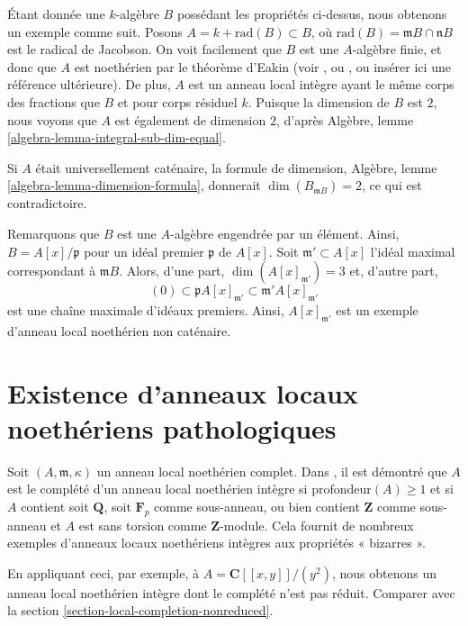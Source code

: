 \medskip\noindent
Étant donnée une $k$-algèbre $B$ possédant les propriétés ci-dessus, nous
obtenons un exemple comme suit. Posons $A = k + \text{rad}(B) \subset B$,
où $\text{rad}(B) = \mathfrak mB \cap \mathfrak nB$ est le radical de Jacobson.
On voit facilement que $B$ est une $A$-algèbre finie, et donc que $A$ est
noethérien par le théorème d'Eakin (voir \cite{Eakin}, ou
\cite[Appendix A1]{Nagata}, ou insérer ici une référence ultérieure).
De plus, $A$ est un anneau local intègre ayant le même corps des fractions que $B$ et
pour corps résiduel $k$. Puisque la dimension de $B$ est $2$, nous voyons que $A$
est également de dimension $2$, d'après
Algèbre, lemme \ref{algebra-lemma-integral-sub-dim-equal}.

\medskip\noindent
Si $A$ était universellement caténaire, la formule de dimension,
Algèbre, lemme \ref{algebra-lemma-dimension-formula},
donnerait $\dim(B_{\mathfrak mB}) = 2$, ce qui est contradictoire.

\medskip\noindent
Remarquons que $B$ est une $A$-algèbre engendrée par un élément.
Ainsi, $B = A[x]/\mathfrak p$ pour un idéal premier
$\mathfrak p$ de $A[x]$. Soit $\mathfrak m' \subset A[x]$
l'idéal maximal correspondant à $\mathfrak mB$. Alors, d'une
part, $\dim(A[x]_{\mathfrak m'}) = 3$ et, d'autre
part,
$$
(0)
\subset \mathfrak pA[x]_{\mathfrak m'}
\subset \mathfrak m'A[x]_{\mathfrak m'}
$$
est une chaîne maximale d'idéaux premiers. Ainsi, $A[x]_{\mathfrak m'}$ est
un exemple d'anneau local noethérien non caténaire.





\section{Existence d'anneaux locaux noethériens pathologiques}
\label{section-bad}

\noindent
Soit $(A, \mathfrak m, \kappa)$ un anneau local noethérien complet.
Dans \cite{Lech}, il est démontré que $A$ est le complété d'un anneau
local noethérien intègre si $\text{profondeur}(A) \geq 1$ et si $A$ contient soit
$\mathbf{Q}$, soit $\mathbf{F}_p$ comme sous-anneau, ou bien contient $\mathbf{Z}$
comme sous-anneau et $A$ est sans torsion comme $\mathbf{Z}$-module.
Cela fournit de nombreux exemples d'anneaux locaux noethériens intègres aux
propriétés « bizarres ».

\medskip\noindent
En appliquant ceci, par exemple, à $A = \mathbf{C}[[x, y]]/(y^2)$, nous obtenons
un anneau local noethérien intègre dont le complété n'est pas réduit.
Comparer avec la
section \ref{section-local-completion-nonreduced}.

